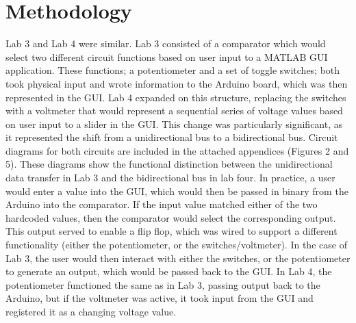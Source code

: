 \documentclass[11pt]{article}
\begin{document}
\section{Methodology}
\label{sec:org24687e2}
Lab 3 and Lab 4 were similar. Lab 3 consisted of a comparator which would select two different circuit functions based on user input to a MATLAB GUI application. These functions; a potentiometer and a set of toggle switches; both took physical input and wrote information to the Arduino board, which was then represented in the GUI. Lab 4 expanded on this structure, replacing the switches with a voltmeter that would represent a sequential series of voltage values based on user input to a slider in the GUI. This change was particularly significant, as it represented the shift from a unidirectional bus to a bidirectional bus. Circuit diagrams for both circuits are included in the attached appendices (Figures 2 and 5). These diagrams show the functional distinction between the unidirectional data transfer in Lab 3 and the bidirectional bus in lab four. In practice, a user would enter a value into the GUI, which would then be passed in binary from the Arduino into the comparator. If the input value matched either of the two hardcoded values, then the comparator would select the corresponding output. This output served to enable a flip flop, which was wired to support a different functionality (either the potentiometer, or the switches/voltmeter). In the case of Lab 3, the user would then interact with either the switches, or the potentiometer to generate an output, which would be passed back to the GUI. In Lab 4, the potentiometer functioned the same as in Lab 3, passing output back to the Arduino, but if the voltmeter was active, it took input from the GUI and registered it as a changing voltage value. 
\end{document}
